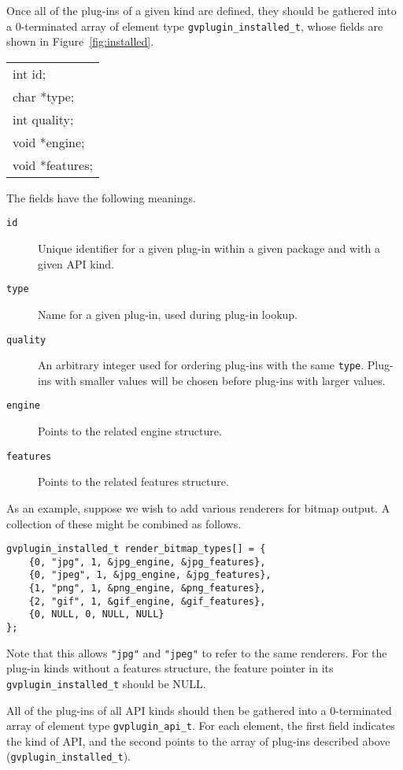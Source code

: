 Once all of the plug-ins of a given kind are defined, they should be
gathered into a 0-terminated array of element type {\tt gvplugin\_installed\_t},
whose fields are shown in Figure~\ref{fig:installed}.
\begin{figure*}[htb]
\centering
\begin{tabular}{|l|} \hline
int id; \\
char *type; \\
int quality; \\
void *engine; \\
void *features; \\
\hline
\end{tabular}
\caption{Plug-in fields}
\label{fig:installed}
\end{figure*}
The fields have the following meanings.
\begin{description}
\item[{\tt id}]
Unique identifier for a given plug-in within a given package and with
a given API kind.
\item[{\tt type}]
Name for a given plug-in, used during plug-in lookup.
\item[{\tt quality}]
An arbitrary integer used for ordering plug-ins with the same {\tt type}.
Plug-ins with smaller values will be chosen before plug-ins with larger
values.
\item[{\tt engine}]
Points to the related engine structure.
\item[{\tt features}]
Points to the related features structure.
\end{description}

As an example, suppose we wish to add various renderers for
bitmap output. A collection of these might be combined as follows.
\begin{verbatim}
gvplugin_installed_t render_bitmap_types[] = {
    {0, "jpg", 1, &jpg_engine, &jpg_features},
    {0, "jpeg", 1, &jpg_engine, &jpg_features},
    {1, "png", 1, &png_engine, &png_features},
    {2, "gif", 1, &gif_engine, &gif_features},
    {0, NULL, 0, NULL, NULL}
};
\end{verbatim}
Note that this allows {\tt "jpg"} and {\tt "jpeg"} to refer to the
same renderers.
For the plug-in kinds without a features structure, the feature pointer in its
{\tt gvplugin\_installed\_t} should be NULL.

All of the plug-ins of all API kinds should then be
gathered into a 0-terminated array of element type {\tt gvplugin\_api\_t}.
For each element, 
the first field indicates the kind of API, and the second points to the
array of plug-ins described above ({\tt gvplugin\_installed\_t}).
  
